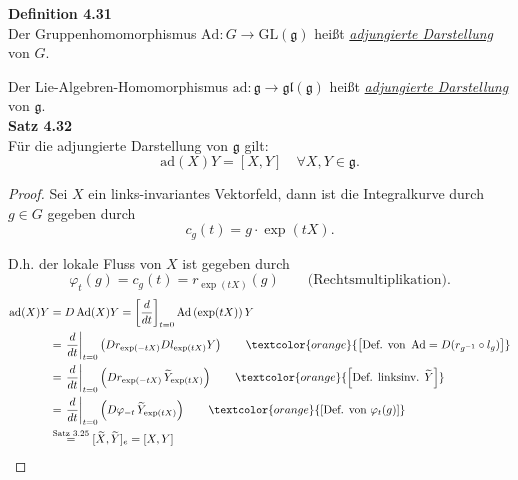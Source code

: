 \documentclass[fleqn, 12pt, letterpaper]{article}
\newcommand{\txt}[1]{\text{#1}}
\begin{document}
\textbf{Definition 4.31}\\
Der Gruppenhomomorphismus $\mathrm{Ad} \colon G \to \mathrm{GL}(\mathfrak{g})$ heißt \emph{\underline{adjungierte Darstellung}} von $G$.

Der Lie-Algebren-Homomorphismus $\mathrm{ad} \colon \mathfrak{g} \to \mathfrak{gl}(\mathfrak{g})$ heißt \emph{\underline{adjungierte Darstellung}} von $\mathfrak{g}$.\\

\textbf{Satz 4.32}\\
Für die adjungierte Darstellung von $\mathfrak{g}$ gilt:
\[
\mathrm{ad}(X)Y = [X, Y] \quad \forall X, Y \in \mathfrak{g}.
\]

\begin{proof}
    Sei $X$ ein links-invariantes Vektorfeld, dann ist die Integralkurve durch $g \in G$ gegeben durch
\[
c_g(t) = g \cdot \exp(tX).
\]

D.h. der lokale Fluss von $X$ ist gegeben durch
\[
\varphi_t(g) = c_g(t) = r_{\exp(tX)}(g) \qquad \text{(Rechtsmultiplikation)}.
\]
\begin{align*}
\operatorname{ad}(X)Y 
&= D\operatorname{Ad}(X)Y 
= \left[ \frac{d}{dt} \right]_{t=0} \operatorname{Ad}\left(\exp(tX)\right)Y \\
&= \left. \frac{d}{dt} \right|_{t=0} \left( Dr_{{\exp(-tX)}} Dl_{{\exp(tX)}} Y \right) 
\hspace{2em} \textcolor{orange}{\left[\text{Def. von } \operatorname{Ad} = D(r_{g^{-1}}\circ l_g)\right]} \\
&= \left. \frac{d}{dt} \right|_{t=0} \left( Dr_{{\exp(-tX)}} \, \widetilde{Y}_{\exp(tX)} \right) 
\hspace{2em} \textcolor{orange}{\left[\text{Def. linksinv. } \widetilde{Y}\right]} \\
&= \left. \frac{d}{dt} \right|_{t=0} \left( D\varphi_{{-t}} \, \widetilde{Y}_{\exp(tX)} \right) 
\hspace{2em} \textcolor{orange}{\left[\text{Def. von } \varphi_t(g)\right]} \\
&\overset{\txt{Satz 3.25}}{=} [\widetilde{X}, \widetilde{Y}]_e = [X, Y]
\end{align*}
\end{proof}
\end{document}
